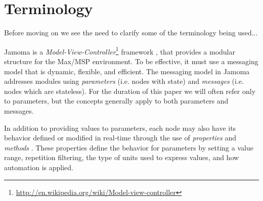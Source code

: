 \documentclass{article}
\begin{document}
\section{Terminology}
Before moving on we see the need to clarify some of the terminology being used...

Jamoma is a \emph{Model-View-Controller}\footnote{\url{http://en.wikipedia.org/wiki/Model-view-controller}} framework \cite{Krasner:1988}, that provides a modular structure for the Max/MSP environment. To be effective, it must use a messaging model that is dynamic, flexible, and efficient. The messaging model in Jamoma addresses modules using \emph{parameters} (i.e. nodes with state) and \emph{messages} (i.e. nodes which are stateless). For the duration of this paper we will often refer only to parameters, but the concepts generally apply to both parameters and messages.

In addition to providing values to parameters, each node may also have its behavior defined or modified in real-time through the use of \emph{properties} and \emph{methods} \cite{Place:2008}. These properties define the behavior for parameters by setting a value range, repetition filtering, the type of units used to express values, and how automation is applied. 


\end{document}
